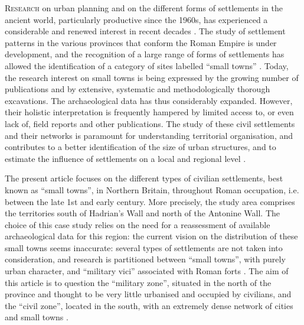 	
\lettrine[nindent=0em,lines=3]{R}{esearch} on urban planning and on the different forms of settlements in the ancient world, particularly productive since the 1960s, has experienced a considerable and renewed interest in recent decades \parencite[227--228]{Petit_1994a}. The study of settlement patterns in the various provinces that conform the Roman Empire is under development, and the recognition of a large range of forms of settlements has allowed the identification of a category of sites labelled “small towns” \parencites[cf.]{Rodwell_1975}{Todd_1970}{Wacher_1995}. Today, the research interest on small towns is being expressed by the growing number of publications \parencites{Blagg_1984}{Favory_2012}{James_2001}{Jones_1991} and by extensive, systematic and methodologically thorough excavations. The archaeological data has thus considerably expanded. However, their holistic interpretation is frequently hampered by limited access to, or even lack of, field reports and other publications. The study of these civil settlements and their networks is paramount for understanding territorial organisation, and contributes to a better identification of the size of urban structures, and to estimate the influence of settlements on a local and regional level \parencite[19]{Mangin_1986}.
	
	The present article focuses on the different types of civilian settlements, best known as “small towns”, in Northern Britain, throughout Roman occupation, i.e. between the late 1st and early  century\AD. More precisely, the study area comprises the territories south of Hadrian's Wall and north of the Antonine Wall. The choice of this case study relies on the need for a reassessment of available archaeological data for this region: the current vision on the distribution of these small towns seems inaccurate: several types of settlements are not taken into consideration, and research is partitioned between “small towns”, with purely urban character, and “military vici” associated with Roman forts \parencites[e.g.]{Mattingly_2006}{Sommer_1984}{Wacher_1995}. The aim of this article is to question the “military zone”, situated in the north of the province and thought to be very little urbanised and occupied by civilians, and the “civil zone”, located in the south, with an extremely dense network of cities and small towns \parencites[cf.][3--5]{Haverfield_1912} {Jones_1990}. 
	
